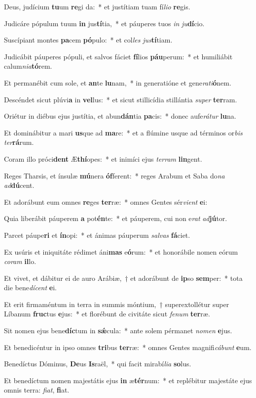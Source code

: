 \item Deus, judícium \textbf{tu}um \textbf{re}gi da:~* et justítiam tuam fí\textit{li}\textit{o} \textbf{re}gis.
\item Judicáre pópulum tuum \textbf{in} jus\textbf{tí}tia,~* et páuperes tuos \textit{in} \textit{ju}\textbf{dí}cio.
\item Suscípiant montes \textbf{pa}cem \textbf{pó}pulo:~* et col\textit{les} \textit{jus}\textbf{tí}tiam.
\item Judicábit páuperes pópuli, et salvos fáciet \textbf{fí}lios \textbf{páu}perum:~* et humiliábit calum\textit{ni}\textit{a}\textbf{tó}rem.
\item Et permanébit cum sole, et \textbf{an}te \textbf{lu}nam,~* in generatióne et gene\textit{ra}\textit{ti}\textbf{ó}nem.
\item Descéndet sicut plúvi\textbf{a} in \textbf{vel}lus:~* et sicut stillicídia stillántia \textit{su}\textit{per} \textbf{ter}ram.
\item Oriétur in diébus ejus justítia, et abun\textbf{dán}tia \textbf{pa}cis:~* donec aufe\textit{rá}\textit{tur} \textbf{lu}na.
\item Et dominábitur a mari \textbf{us}que ad \textbf{ma}re:~* et a flúmine usque ad términos or\textit{bis} \textit{ter}\textbf{rá}rum.
\item Coram illo próci\textbf{dent} Æ\textbf{thí}opes:~* et inimíci ejus \textit{ter}\textit{ram} \textbf{lin}gent.
\item Reges Tharsis, et ínsulæ \textbf{mú}nera \textbf{óf}ferent:~* reges Arabum et Saba do\textit{na} \textit{ad}\textbf{dú}cent.
\item Et adorábunt eum omnes \textbf{re}ges \textbf{ter}ræ:~* omnes Gentes sér\textit{vi}\textit{ent} \textbf{e}i:
\item Quia liberábit páuperem \textbf{a} pot\textbf{én}te:~* et páuperem, cui non e\textit{rat} \textit{ad}\textbf{jú}tor.
\item Parcet páupe\textbf{ri} et \textbf{ín}opi:~* et ánimas páuperum \textit{sal}\textit{vas} \textbf{fá}ciet.
\item Ex usúris et iniquitáte rédimet áni\textbf{mas} e\textbf{ó}rum:~* et honorábile nomen eórum \textit{co}\textit{ram} \textbf{il}lo.
\item Et vivet, et dábitur ei de auro Arábiæ,~† et adorábunt de \textbf{ip}so \textbf{sem}per:~* tota die bene\textit{dí}\textit{cent} \textbf{e}i.
\item Et erit firmaméntum in terra in summis móntium,~† superextollétur super Líbanum \textbf{fruc}tus \textbf{e}jus:~* et florébunt de civitáte sicut \textit{fe}\textit{num} \textbf{ter}ræ.
\item Sit nomen ejus bene\textbf{díc}tum in \textbf{sǽ}cula:~* ante solem pérmanet \textit{no}\textit{men} \textbf{e}jus.
\item Et benedicéntur in ipso omnes \textbf{tri}bus \textbf{ter}ræ:~* omnes Gentes magnifi\textit{cá}\textit{bunt} \textbf{e}um.
\item Benedíctus Dóminus, \textbf{De}us \textbf{Is}raël,~* qui facit mirabí\textit{li}\textit{a} \textbf{so}lus.
\item Et benedíctum nomen majestátis ejus \textbf{in} æ\textbf{tér}num:~* et replébitur majestáte ejus omnis terra: \textit{fi}\textit{at}, \textbf{fi}at.
